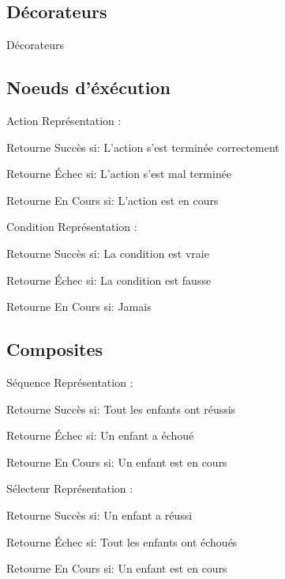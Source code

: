 \documentclass[presentation]{beamer}
\begin{document}
\subsection{Décorateurs}
\label{sec-2-1}
\begin{frame}[label=sec-2-1-1]{Décorateurs}
\end{frame}

\subsection{Noeuds d'éxécution}
\label{sec-2-2}
\begin{frame}[label=sec-2-2-1]{\alert{Action}}
Représentation :

Retourne Succès si:
L'action s'est terminée correctement

Retourne Échec si:
L'action s'est mal terminée

Retourne En Cours si:
L'action est en cours
\end{frame}


\begin{frame}[label=sec-2-2-2]{\alert{Condition}}
Représentation :

Retourne Succès si:
La condition est vraie

Retourne Échec si:
La condition est fausse

Retourne En Cours si:
Jamais
\end{frame}

\subsection{Composites}
\label{sec-2-3}

\begin{frame}[label=sec-2-3-1]{\alert{Séquence}}
Représentation :

Retourne Succès si:
Tout les enfants ont réussis

Retourne Échec si:
Un enfant a échoué

Retourne En Cours si:
Un enfant est en cours
\end{frame}

\begin{frame}[label=sec-2-3-2]{\alert{Sélecteur}}
Représentation :

Retourne Succès si:
Un enfant a réussi

Retourne Échec si:
Tout les enfants ont échoués

Retourne En Cours si:
Un enfant est en cours
\end{frame}
\end{document}
